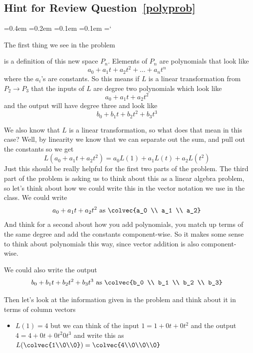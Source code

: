 
\subsection*{Hint for Review Question~\ref{polyprob}}

{\ttfamily
{}\font=0.4em
\font=0.2em
\font=0.1em
\font=0.1em
\hyphenchar\font=`\-

\hypertarget{scripts_linear_transformations_hint}{The first thing we see in the problem} is a definition of this new space $P_n$. Elements of $P_n$ are polynomials that look like \[a_0 + a_1 t +a_2 t^2 + \ldots + a_n t^n\] where the $a_i$'s are constants. So this means if $L$ is a linear transformation from $P_2 \to P_3$ that the inputs of $L$ are degree two polynomials which look like \[a_0 + a_1 t +a_2 t^2\]
and the output will have degree three and look like \[b_0 + b_1 t +b_2 t^2 + b_3 t^3\]

We also know that $L$ is a linear transformation, so what does that mean in this case? Well, by linearity we know that we can separate out the sum, and pull out the constants so we get
\[ L (a_0 + a_1 t +a_2 t^2) = a_0L(1) + a_1L( t) +a_2 L( t^2)\]
Just this should be really helpful for the first two parts of the problem. The third part of the problem is asking us to think about this as a linear algebra problem, so let's think about how we could write this in the vector notation we use in the class. We could write 
\[a_0 + a_1 t +a_2 t^2 \text{ as } \colvec{a_0 \\ a_1 \\ a_2} \]
And think for a second about how you add polynomials, you match up terms of the same degree and add the constants component-wise. So it makes some sense to think about polynomials this way, since vector addition is also component-wise.

We could also write the output 
\[  b_0 + b_1 t +b_2 t^2 + b_3 t^3 \text{ as }  \colvec{b_0 \\ b_1 \\ b_2 \\ b_3}\]

Then let's look at the information given in the problem and think about it in terms of column vectors 
\begin{itemize}
\item $L(1) = 4$ but we can think of the input $1= 1+ 0t + 0t^2 $ and the output  $4 = 4+ 0t + 0t^2 0t^3$ and write this as $ L (\colvec{1\\0\\0}) = \colvec{4\\0\\0\\0}$


\end{itemize}}
